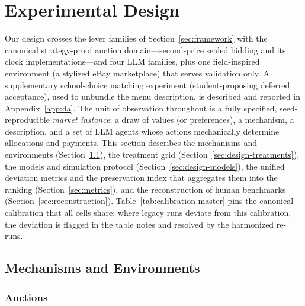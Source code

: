 
\section{Experimental Design}\label{sec:design}

Our design crosses the lever families of Section~\ref{sec:framework} with the
canonical strategy-proof auction domain---second-price sealed bidding and its
clock implementations---and four LLM families, plus one field-inspired
environment (a stylized eBay marketplace) that serves validation only. A
supplementary school-choice matching experiment (student-proposing deferred
acceptance), used to unbundle the menu description, is described and reported
in Appendix~\ref{app:da}. The unit
of observation throughout is a fully specified, seed-reproducible \emph{market
instance}: a draw of values (or preferences), a mechanism, a description, and a
set of LLM agents whose actions mechanically determine allocations and
payments. This section describes the mechanisms and environments
(Section~\ref{sec:design-environments}), the treatment grid
(Section~\ref{sec:design-treatments}), the models and simulation protocol
(Section~\ref{sec:design-models}), the unified deviation metrics and the
preservation index that aggregates them into the ranking
(Section~\ref{sec:metrics}), and the reconstruction of human benchmarks
(Section~\ref{sec:reconstruction}). Table~\ref{tab:calibration-master} pins the
canonical calibration that all cells share; where legacy runs deviate from this
calibration, the deviation is flagged in the table notes and resolved by the
harmonized re-runs.

\subsection{Mechanisms and Environments}\label{sec:design-environments}

\subsubsection{Auctions}\label{sec:design-auctions}

